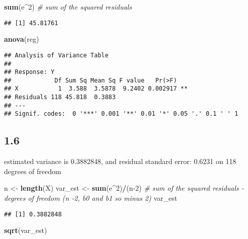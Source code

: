 \documentclass[
]{article}
\newenvironment{Shaded}{\begin{snugshade}}{\end{snugshade}}
\newcommand{\CommentTok}[1]{\textcolor[rgb]{0.56,0.35,0.01}{\textit{#1}}}
\newcommand{\DecValTok}[1]{\textcolor[rgb]{0.00,0.00,0.81}{#1}}
\newcommand{\KeywordTok}[1]{\textcolor[rgb]{0.13,0.29,0.53}{\textbf{#1}}}
\newcommand{\NormalTok}[1]{#1}
\newcommand{\OperatorTok}[1]{\textcolor[rgb]{0.81,0.36,0.00}{\textbf{#1}}}
\newcommand{\StringTok}[1]{\textcolor[rgb]{0.31,0.60,0.02}{#1}}
\begin{document}
\begin{Shaded}
\begin{Highlighting}[]
\KeywordTok{sum}\NormalTok{(e}\OperatorTok{^}\DecValTok{2}\NormalTok{) }\CommentTok{# sum of the squared residuals }
\end{Highlighting}
\end{Shaded}

\begin{verbatim}
## [1] 45.81761
\end{verbatim}

\begin{Shaded}
\begin{Highlighting}[]
\KeywordTok{anova}\NormalTok{(reg)}
\end{Highlighting}
\end{Shaded}

\begin{verbatim}
## Analysis of Variance Table
## 
## Response: Y
##            Df Sum Sq Mean Sq F value   Pr(>F)   
## X           1  3.588  3.5878  9.2402 0.002917 **
## Residuals 118 45.818  0.3883                    
## ---
## Signif. codes:  0 '***' 0.001 '**' 0.01 '*' 0.05 '.' 0.1 ' ' 1
\end{verbatim}

\hypertarget{section-5}{%
\subsection{1.6}\label{section-5}}

estimated variance is 0.3882848, and residual standard error: 0.6231 on
118 degrees of freedom

\begin{Shaded}
\begin{Highlighting}[]
\NormalTok{n <-}\StringTok{ }\KeywordTok{length}\NormalTok{(X)}
\NormalTok{var_est <-}\StringTok{ }\KeywordTok{sum}\NormalTok{(e}\OperatorTok{^}\DecValTok{2}\NormalTok{)}\OperatorTok{/}\NormalTok{(n}\DecValTok{-2}\NormalTok{) }\CommentTok{# sum of the squared residuals - degrees of freedom (n -2, b0 and b1 so minus 2)}
\NormalTok{var_est}
\end{Highlighting}
\end{Shaded}

\begin{verbatim}
## [1] 0.3882848
\end{verbatim}

\begin{Shaded}
\begin{Highlighting}[]
\KeywordTok{sqrt}\NormalTok{(var_est)}
\end{Highlighting}
\end{Shaded}
\end{document}
